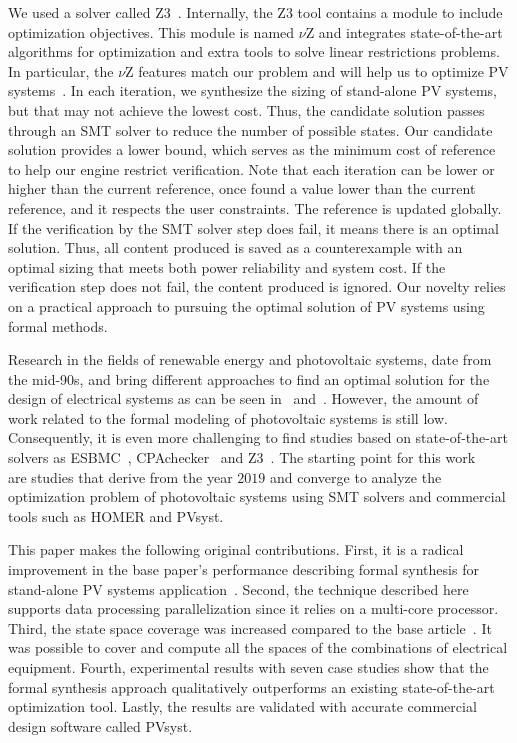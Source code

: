 \documentclass[10pt,journal,compsoc]{IEEEtran}
\begin{document}
We used a solver called Z3~\cite{BjornerPF15}. Internally, the Z3 tool contains a module to include optimization objectives. This module is named $\nu$Z and integrates state-of-the-art algorithms for optimization and extra tools to solve linear restrictions problems. In particular, the $\nu$Z features match our problem and will help us to optimize PV systems~\cite{BjornerPF15}. In each iteration, we synthesize the sizing of stand-alone PV systems, but that may not achieve the lowest cost. Thus, the candidate solution passes through an SMT solver to reduce the number of possible states. Our candidate solution provides a lower bound, which serves as the minimum cost of reference to help our engine restrict verification. Note that each iteration can be lower or higher than the current reference, once found a value lower than the current reference, and it respects the user constraints. The reference is updated globally. If the verification by the SMT solver step does fail, it means there is an optimal solution. Thus, all content produced is saved as a counterexample with an optimal sizing that meets both power reliability and system cost. If the verification step does not fail, the content produced is ignored. Our novelty relies on a practical approach to pursuing the optimal solution of PV systems using formal methods. 

Research in the fields of renewable energy and photovoltaic systems, date from the mid-90s, and bring different approaches to find an optimal solution for the design of electrical systems as can be seen in~\cite{Driouich2018} and~\cite{Applasamy2011}. However, the amount of work related to the formal modeling of photovoltaic systems is still low. Consequently, it is even more challenging to find studies based on state-of-the-art solvers as ESBMC~\cite{esbmc2018}, CPAchecker~\cite{Beyer2011} and Z3~\cite{BjornerPF15}. The starting point for this work~\cite{VSTTE2020}~\cite{TrindadeCordeiro19} are studies that derive from the year $2019$ and converge to analyze the optimization problem of photovoltaic systems using SMT solvers and commercial tools such as HOMER and PVsyst. 

This paper makes the following original contributions. First, it is a radical improvement in the base paper's performance describing formal synthesis for stand-alone PV systems application~\cite{DBLP:journals/corr/abs-1909-13139}. Second, the technique described here supports data processing parallelization since it relies on a multi-core processor. Third, the state space coverage was increased compared to the base article~\cite{VSTTE2020}. It was possible to cover and compute all the spaces of the combinations of electrical equipment. Fourth, experimental results with seven case studies show that the formal synthesis approach qualitatively outperforms an existing state-of-the-art optimization tool. Lastly, the results are validated with accurate commercial design software called PVsyst.
\end{document}
